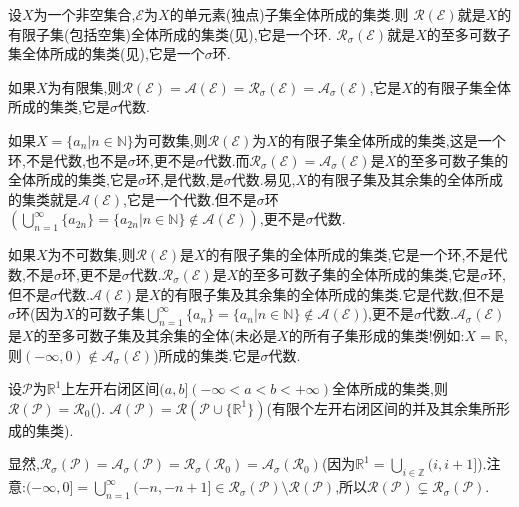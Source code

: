 \documentclass[../../main.tex]{subfiles}%
\begin{document}
\begin{example}
设$X$为一个非空集合,$\mathscr{E}$为$X$的单元素(独点)子集全体所成的集类.则
$\mathscr{R}(\mathscr{E})$就是$X$的有限子集(包括空集)全体所成的集类(见),它是一个环.
$\mathscr{R}_\sigma(\mathscr{E})$就是$X$的至多可数子集全体所成的集类(见),它是一个$\sigma$环.

如果$X$为有限集,则$\mathscr{R}(\mathscr{E})=\mathscr{A}(\mathscr{E})=\mathscr{R}_\sigma(\mathscr{E})=\mathscr{A}_\sigma(\mathscr{E})$,它是$X$的有限子集全体所成的集类,它是$\sigma$代数.

如果$X=\{a_n|n\in\mathbb{N}\}$为可数集,则$\mathscr{R}(\mathscr{E})$为$X$的有限子集全体所成的集类,这是一个环,不是代数,也不是$\sigma$环,更不是$\sigma$代数.而$\mathscr{R}_\sigma(\mathscr{E})=\mathscr{A}_\sigma(\mathscr{E})$是$X$的至多可数子集的全体所成的集类,它是$\sigma$环,是代数,是$\sigma$代数.易见,$X$的有限子集及其余集的全体所成的集类就是$\mathscr{A}(\mathscr{E})$,它是一个代数.但不是$\sigma$环$\left(\bigcup_{n=1}^{\infty}\{a_{2n}\}=\{a_{2n}|n\in\mathbb{N}\}\notin\mathscr{A}(\mathscr{E})\right)$,更不是$\sigma$代数.

如果$X$为不可数集,则$\mathscr{R}(\mathscr{E})$是$X$的有限子集的全体所成的集类,它是一个环,不是代数,不是$\sigma$环,更不是$\sigma$代数.$\mathscr{R}_\sigma(\mathscr{E})$是$X$的至多可数子集的全体所成的集类,它是$\sigma$环,但不是$\sigma$代数.$\mathscr{A}(\mathscr{E})$是$X$的有限子集及其余集的全体所成的集类.它是代数,但不是$\sigma$环(因为$X$的可数子集$\bigcup_{n=1}^{\infty}\{a_n\}=\{a_n|n\in\mathbb{N}\}\notin\mathscr{A}(\mathscr{E})$),更不是$\sigma$代数.$\mathscr{A}_\sigma(\mathscr{E})$是$X$的至多可数子集及其余集的全体(未必是$X$的所有子集形成的集类!例如:$X=\mathbb{R}$,则$(-\infty,0)\notin\mathscr{A}_\sigma(\mathscr{E})$)所成的集类.它是$\sigma$代数.
\end{example}

\begin{example}
设$\mathscr{P}$为$\mathbb{R}^1$上左开右闭区间$(a,b](-\infty<a<b<+\infty)$全体所成的集类,则$\mathscr{R}(\mathscr{P})=\mathscr{R}_0$().
$\mathscr{A}(\mathscr{P})=\mathscr{R}(\mathscr{P}\cup\{\mathbb{R}^1\})$(有限个左开右闭区间的并及其余集所形成的集类).

显然,$\mathscr{R}_\sigma(\mathscr{P})=\mathscr{A}_\sigma(\mathscr{P})=\mathscr{R}_\sigma(\mathscr{R}_0)=\mathscr{A}_\sigma(\mathscr{R}_0)$(因为$\mathbb{R}^1=\bigcup_{i\in\mathbb{Z}}(i,i+1]$).注意:$(-\infty,0]=\bigcup_{n=1}^{\infty}(-n,-n+1]\in\mathscr{R}_\sigma(\mathscr{P})\setminus\mathscr{R}(\mathscr{P})$,所以$\mathscr{R}(\mathscr{P})\varsubsetneq\mathscr{R}_\sigma(\mathscr{P})$.
\end{example}
\end{document}

